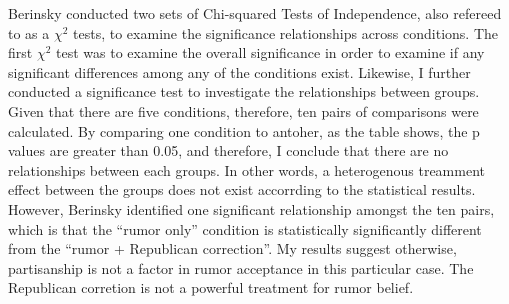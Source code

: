 \documentclass[AER]{AEA}
\begin{document}
\begin{table}

\caption{\label{tab:unnamed-chunk-8}Significance test results between conditions}
\centering
{}
\end{table}

Berinsky conducted two sets of Chi-squared Tests of Independence, also
refereed to as a \(\chi^2\) tests, to examine the significance
relationships across conditions. The first \(\chi^2\) test was to
examine the overall significance in order to examine if any significant
differences among any of the conditions exist. Likewise, I further
conducted a significance test to investigate the relationships between
groups. Given that there are five conditions, therefore, ten pairs of
comparisons were calculated. By comparing one condition to antoher, as
the table shows, the p values are greater than 0.05, and therefore, I
conclude that there are no relationships between each groups. In other
words, a heterogenous treamment effect between the groups does not exist
accorrding to the statistical results. However, Berinsky identified one
significant relationship amongst the ten pairs, which is that the
``rumor only'' condition is statistically significantly different from
the ``rumor + Republican correction''. My results suggest otherwise,
partisanship is not a factor in rumor acceptance in this particular
case. The Republican corretion is not a powerful treatment for rumor
belief.
\end{document}
